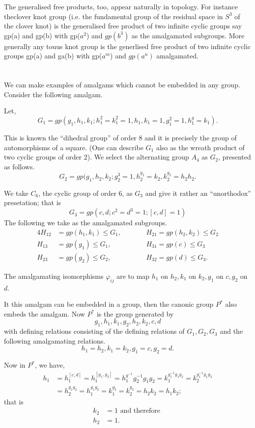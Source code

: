 The generalised free products, too, appear naturally in topology. For
instance theclover knot group (i.e. the fundamental group of the
residual space in $S^3$ of the clover knot) is the generalised free
product of two infinite cyclic groups say gp(a) and gp(b) with
gp($a^2$) and $gp(b^3)$ as the amalgamated subgroups. More generally
any touus knot group is the generlised free product of two infinite
cyclic groups gp(a) and ga(b) with gp($a^m$) and $gp(a^n)$
amalgamated. 

\section{}%

We can make examples of amalgams which cannot be embedded in any
group. Consider the following amalgam. 

Let, 
$$
G_1 = gp(g_1, h_1, k_1 ; h^2_1 = k^2_1=1, h_1, k_1 =1,  g^2_1 =
1,h^g_1 =k_1). 
$$

This is known the ``dihedral group'' of order 8 and it is precisely
the group of automorphisms of a square. (One can describe $G_1$ also
as the wreath product of two cyclic groups of order 2). We select the
alternating group $A_4$ as $G_2$, presented as follows. 
$$
G_2 = gp(g_1, h_2, k_2; g^3_2 =1,  h^{g_2}_2 = k_2, k^{g_2}_2 = h_2 h_2.
$$

We take $C_6$, the cyclic group of order $6$, as $G_3$ and give it
rather an ``unorthodox'' presetation; that is  
$$
G_3 = gp( c,d; c^2 = d^3 = 1; [c, d ] =1)
$$
The following we take as the amalgamated subgroups.
\begin{alignat*}{4}
  H_{12}& = gp(h_1, k_1) \leq G_1,&\qquad & H_{21} = gp(h_2, k_2) \leq G_2\\
  H_{13} & = gp(g_1) \leq G_1,  && H_{31} = gp(c) \leq G_3\\
  H_{23} & = gp(g_2) \leq G_2,  && H_{32} = gp(d) \leq G_3.
\end{alignat*} 

The amalgamating isomorphisms $\varphi_{ij}$ are to map $h_1$ on $h_2,
k_1$ on $k_2, g_1$ on $c, g_2$ on $d$. 

It this amalgam can be embedded in a group, then the canonic group
$P^*$ also embeds the amalgam. Now $P^*$ is the group generated by  
$$
g_1, h_1, k_1, g_2, h_2, k_2, c, d
$$
with defining relations consisting of the defining relations of $G_1,
G_2, G_3$ and the following amalgamating relations. 
$$
h_1 = h_2, k_1= k_2, g_1=c, g_2=d.
$$

Now in $P^*$, we have,
\begin{align*}
  h_1 & = h^{[c, d]}_1 = h^{[g_1, g_2]}_1= h^{g^{-1}}_1 g^{-1}_2 g_1
  g_2 = k^{g^{-1}_1 g_1 g_2}_1 = k^{g^{-1}_1 g_1 g_2}_2\\ 
  & = h^{g_1 g_2}_2 = h^{g_1 g_2}_1 = k^{ g_2}_1 = k^{ g_2}_2 = h_2 k_2 = h_1 k_2 ; 
\end{align*}
that is 
\begin{align*}
  k_2& = 1 \text{ and therefore }\\
  h_2 & = 1.
\end{align*}

